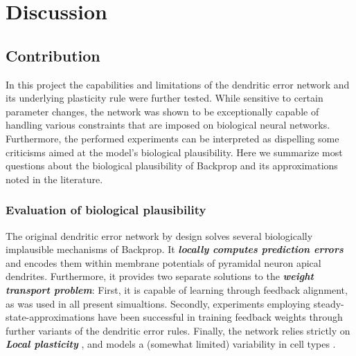 
\chapter{Discussion}


\section{Contribution}

In this project the capabilities and limitations of the dendritic error network and its underlying plasticity rule were
further tested. While sensitive to certain parameter changes, the network was shown to be exceptionally capable of 
handling various constraints that are imposed on biological neural networks. Furthermore, the performed experiments
can be interpreted as dispelling some criticisms aimed at the model's biological plausibility. Here we summarize 
most questions about the biological plausibility of Backprop and its approximations noted in the literature.


\subsection*{Evaluation of biological plausibility}

The original dendritic error network by design solves several biologically implausible mechanisms of Backprop. It
\textit{\textbf{locally computes prediction errors}} and encodes them within membrane potentials of pyramidal neuron
apical dendrites. Furthermore, it provides two separate solutions to the \textit{\textbf{weight transport problem}}:
First, it is capable of learning through feedback alignment, as was used in all present simualtions. Secondly,
experiments employing steady-state-approximations have been successful in training feedback weights through further
variants of the dendritic error rules. Finally, the network relies strictly on \textit{\textbf{Local plasticity}}
\citep{Whittington2017}, and models a (somewhat limited) variability in cell types \citep{Bartunov2018}.\newline

